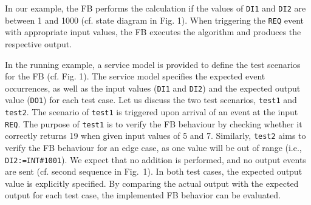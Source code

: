 \begin{bibunit}
\begin{itemize}
\end{itemize}

In our example, the FB performs the calculation if the values of \texttt{DI1} and \texttt{DI2} are between 1 and 1000 (cf. state diagram in Fig. 1). When triggering the \texttt{REQ} event with appropriate input values, the FB executes the algorithm and produces the respective output. 

In the running example, a service model is provided to define the test scenarios for the FB (cf. Fig. 1). The service model specifies the expected event occurrences, as well as the input values (\texttt{DI1} and \texttt{DI2}) and the expected output value (\texttt{DO1}) for each test case. 
Let us discuss the two test scenarios,  \texttt{test1} and \texttt{test2}. 
The scenario of \texttt{test1} is triggered upon arrival of an event at the input \texttt{REQ}. The purpose of \texttt{test1} is to verify the FB behaviour by checking whether it correctly returns 19 when given input values of 5 and 7. 
% 
% 
% 
% 
% 
% 
%     
%     
Similarly, \texttt{test2} aims to verify the FB behaviour for an edge case, as one value will be out of range (i.e., \texttt{DI2:=INT\#1001}). We expect that no addition is performed, and no output events are sent (cf. second sequence in Fig.~1). 
In both test cases, the expected output value is explicitly specified. By comparing the actual output with the expected output for each test case, the implemented FB behavior can be evaluated.%



\end{bibunit}
